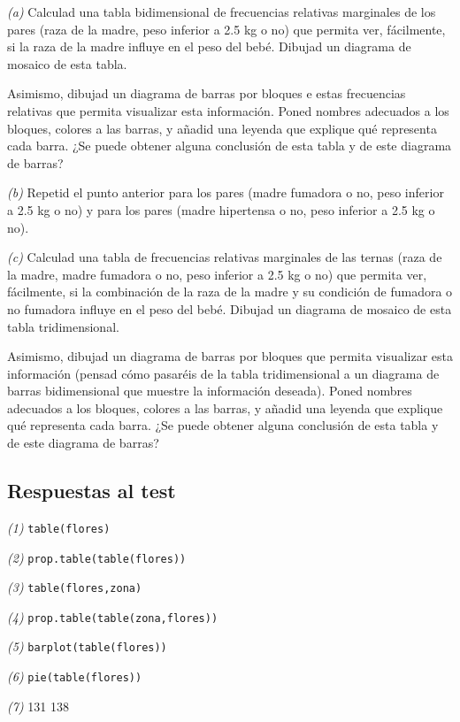 \documentclass[]{book}
\theoremstyle{definition}
\theoremstyle{definition}
\theoremstyle{definition}
\theoremstyle{remark}
\begin{document}
\emph{(a)} Calculad una tabla bidimensional de frecuencias relativas marginales de los pares (raza de la madre, peso inferior a 2.5 kg o no) que permita ver, fácilmente, si la raza de la madre influye en el peso del bebé. Dibujad un diagrama de mosaico de esta tabla.

Asimismo, dibujad un diagrama de barras por bloques e estas frecuencias relativas que permita visualizar esta información. Poned nombres adecuados a los bloques, colores a las barras, y añadid una leyenda que explique qué representa cada barra. ¿Se puede obtener alguna conclusión de esta tabla y de este diagrama de barras?

\emph{(b)} Repetid el punto anterior para los pares (madre fumadora o no, peso inferior a 2.5 kg o no) y para los pares (madre hipertensa o no, peso inferior a 2.5 kg o no).

\emph{(c)} Calculad una tabla de frecuencias relativas marginales de las ternas (raza de la madre, madre fumadora o no, peso inferior a 2.5 kg o no) que permita ver, fácilmente, si la combinación de la raza de la madre y su condición de fumadora o no fumadora influye en el peso del bebé. Dibujad un diagrama de mosaico de esta tabla tridimensional.

Asimismo, dibujad un diagrama de barras por bloques que permita visualizar esta información (pensad cómo pasaréis de la tabla tridimensional a un diagrama de barras bidimensional que muestre la información deseada). Poned nombres adecuados a los bloques, colores a las barras, y añadid una leyenda que explique qué representa cada barra. ¿Se puede obtener alguna conclusión de esta tabla y de este diagrama de barras?

\hypertarget{respuestas-al-test-7}{%
\subsection*{Respuestas al test}\label{respuestas-al-test-7}}

\emph{(1)} \texttt{table(flores)}

\emph{(2)} \texttt{prop.table(table(flores))}

\emph{(3)} \texttt{table(flores,zona)}

\emph{(4)} \texttt{prop.table(table(zona,flores))}

\emph{(5)} \texttt{barplot(table(flores))}

\emph{(6)} \texttt{pie(table(flores))}

\emph{(7)} 131 138
\end{document}
